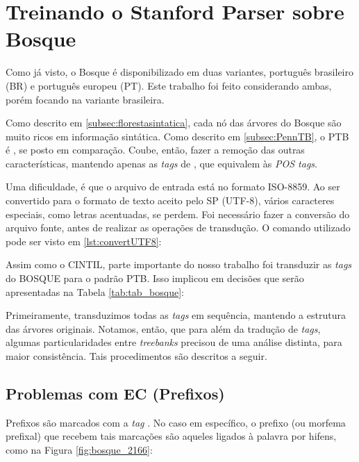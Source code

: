 \section{Treinando o Stanford Parser sobre Bosque}
\label{sec:treinando_sp_bosque}

Como já visto, o Bosque é disponibilizado em duas variantes, português brasileiro (BR) e português europeu (PT). Este trabalho foi feito considerando ambas, porém focando na variante brasileira.

Como descrito em \ref{subsec:florestasintatica}, cada nó das árvores do Bosque são muito ricos em informação sintática. Como descrito em \ref{subsec:PennTB}, o PTB é , se posto em comparação. Coube, então, fazer a remoção das outras características, mantendo apenas as \textit{tags} de , que equivalem às \textit{POS tags}.

Uma dificuldade, é que o arquivo de entrada está no formato ISO-8859. Ao ser convertido para o formato de texto aceito pelo SP (UTF-8), vários caracteres especiais, como letras acentuadas, se perdem. Foi necessário fazer a conversão do arquivo fonte, antes de realizar as operações de transdução. O comando utilizado pode ser visto em \ref{lst:convertUTF8}:
\begin{center}
    
\end{center}
Assim como o CINTIL, parte importante do nosso trabalho foi transduzir as \textit{tags} do BOSQUE para o padrão PTB. Isso implicou em decisões que serão apresentadas na Tabela \ref{tab:tab_bosque}:

\begin{center}
    
\end{center}

Primeiramente, transduzimos todas as \textit{tags} em sequência, mantendo a estrutura das árvores originais. Notamos, então, que para além da tradução de \textit{tags}, algumas particularidades entre \textit{treebanks} precisou de uma análise distinta, para maior consistência. Tais procedimentos são descritos a seguir.
\subsection{Problemas com EC (Prefixos)}
\label{subsec:sec_ec}

Prefixos são marcados com a \textit{tag} .
No caso em específico, o prefixo (ou morfema prefixal) que recebem tais marcações são aqueles ligados à palavra por hifens, como na Figura \ref{fig:bosque_2166}:

